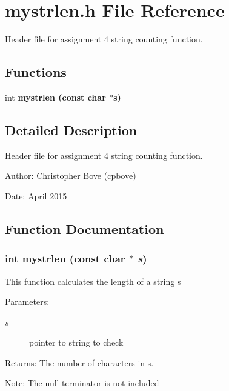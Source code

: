 \section{mystrlen.h File Reference}
\label{mystrlen_8h}
Header file for assignment 4 string counting function. 

\subsection*{Functions}
\begin{CompactItemize}
\item 
int \bf{mystrlen} (const char $\ast$s)
\end{CompactItemize}


\subsection{Detailed Description}
Header file for assignment 4 string counting function. 

\begin{Desc}
\item[Author:]Christopher Bove (cpbove) \end{Desc}
\begin{Desc}
\item[Date:]April 2015 \end{Desc}


\subsection{Function Documentation}
\subsubsection{\setlength{\rightskip}{0pt plus 5cm}int mystrlen (const char $\ast$ {\em s})}\label{mystrlen_8h_cdaeaf9a3518fd8974119c6415075e3f}


This function calculates the length of a string s \begin{Desc}
\item[Parameters:]
\begin{description}
\item[{\em s}]pointer to string to check \end{description}
\end{Desc}
\begin{Desc}
\item[Returns:]The number of characters in s. \end{Desc}
\begin{Desc}
\item[Note:]The null terminator is not included \end{Desc}
